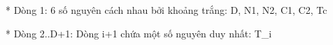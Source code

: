 * Dòng 1: 6 số nguyên cách nhau bởi khoảng trắng: D, N1, N2, C1, C2, Tc   

    * Dòng 2..D+1: Dòng i+1 chứa một số nguyên duy nhất: T\_i   

\